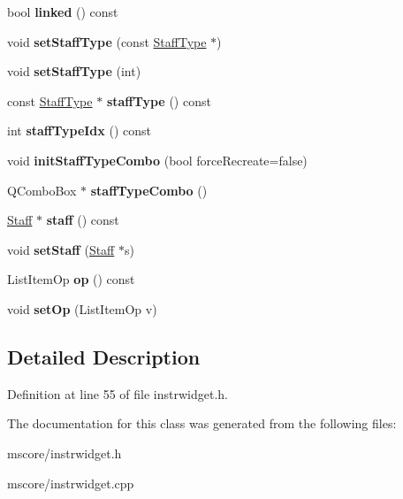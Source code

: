 \begin{DoxyCompactItemize}
bool {\bfseries linked} () const
\item 
\mbox{\label{class_ms_1_1_staff_list_item_abf5185512cfeb40d431ece1b486d41ee}} 
void {\bfseries set\+Staff\+Type} (const \hyperlink{class_ms_1_1_staff_type}{Staff\+Type} $\ast$)
\item 
\mbox{\label{class_ms_1_1_staff_list_item_a500994bf781520f6f42b89c63c03c93f}} 
void {\bfseries set\+Staff\+Type} (int)
\item 
\mbox{\label{class_ms_1_1_staff_list_item_a61ec5fd499b85fc9e0c4339bb4eecba0}} 
const \hyperlink{class_ms_1_1_staff_type}{Staff\+Type} $\ast$ {\bfseries staff\+Type} () const
\item 
\mbox{\label{class_ms_1_1_staff_list_item_abb6be15ed6ff789e5207beca2442e721}} 
int {\bfseries staff\+Type\+Idx} () const
\item 
\mbox{\label{class_ms_1_1_staff_list_item_a8294d5c77ff97164f4a0ddafd790579e}} 
void {\bfseries init\+Staff\+Type\+Combo} (bool force\+Recreate=false)
\item 
\mbox{\label{class_ms_1_1_staff_list_item_aa806c3c14d06c350fc298d14d7c40664}} 
Q\+Combo\+Box $\ast$ {\bfseries staff\+Type\+Combo} ()
\item 
\mbox{\label{class_ms_1_1_staff_list_item_ab9c4ac1dd84fe0498197f138fd26dd16}} 
\hyperlink{class_ms_1_1_staff}{Staff} $\ast$ {\bfseries staff} () const
\item 
\mbox{\label{class_ms_1_1_staff_list_item_a9e9361199e2ca49c401e79fff837c0f6}} 
void {\bfseries set\+Staff} (\hyperlink{class_ms_1_1_staff}{Staff} $\ast$s)
\item 
\mbox{\label{class_ms_1_1_staff_list_item_a458ae22f559e5137c574c2ce94db95ab}} 
List\+Item\+Op {\bfseries op} () const
\item 
\mbox{\label{class_ms_1_1_staff_list_item_ab4acbc084253f5491991f621b75bc324}} 
void {\bfseries set\+Op} (List\+Item\+Op v)
\end{DoxyCompactItemize}


\subsection{Detailed Description}


Definition at line 55 of file instrwidget.\+h.



The documentation for this class was generated from the following files\+:\begin{DoxyCompactItemize}
\item 
mscore/instrwidget.\+h\item 
mscore/instrwidget.\+cpp\end{DoxyCompactItemize}
